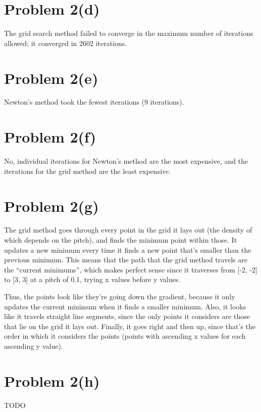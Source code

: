 \documentclass{article}
\begin{document}
\section*{Problem 2(d)}

The grid search method failed to converge in the maximum number of iterations allowed; it converged in 2602 iterations.

\section*{Problem 2(e)}

Newton's method took the fewest iterations (9 iterations).

\section*{Problem 2(f)}

No, individual iterations for Newton's method are the most expensive, and the iterations for the grid method are the least expensive.

\section*{Problem 2(g)}

The grid method goes through every point in the grid it lays out (the density of which depends on the pitch), and finds the minimum point within those. It updates a new minimum every time it finds a new point that's smaller than the previous minimum. This means that the path that the grid method travels are the ``current minimums'', which makes perfect sense since it traverses from [-2, -2] to [3, 3] at a pitch of 0.1, trying x values before y values. 

Thus, the points look like they're going down the gradient, because it only updates the current minimum when it finds a smaller minimum. Also, it looks like it travels straight line segments, since the only points it considers are those that lie on the grid it lays out. Finally, it goes right and then up, since that's the order in which it considers the points (points with ascending x values for each ascending y value).

\section*{Problem 2(h)}

TODO
\end{document}
